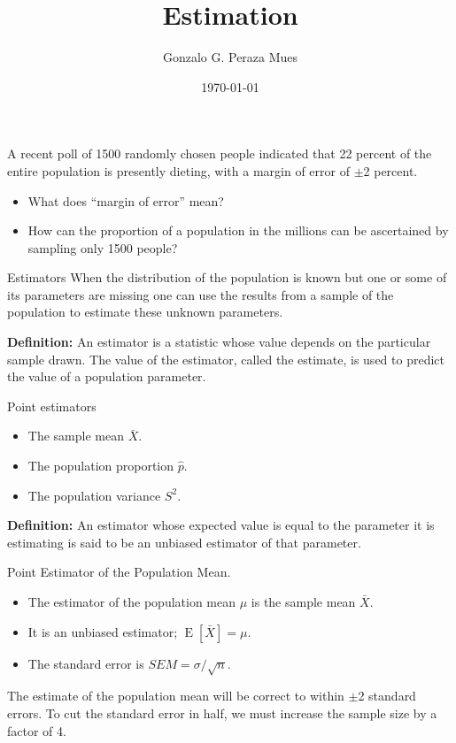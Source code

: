 \documentclass{beamer}
\title{Estimation}
\date{\today}
\author{Gonzalo G. Peraza Mues}
\newcommand{\E}[1]{\operatorname{E}\left[#1\right]}
\begin{document}
\maketitle
\begin{frame}
  A recent poll of 1500 randomly chosen people indicated that 22 percent of the
  entire population is presently dieting, with a margin of error of $\pm$2 percent.

  \begin{itemize}
  \item What does ``margin of error'' mean?
  \item How can the proportion of a population in the millions can be
    ascertained by sampling only 1500 people?
  \end{itemize}
\end{frame}

\begin{frame}{Estimators}
  When the distribution of the population is known but one or some of its
  parameters are missing one can use the results from a sample of the population
  to estimate these unknown parameters.

  \textbf{Definition: }An \alert{estimator} is a statistic whose value depends on
  the particular sample drawn. The value of the estimator, called the
  \alert{estimate}, is used to predict the value of a population parameter.
\end{frame}

\begin{frame}{Point estimators}

  \begin{itemize}
  \item The sample mean $\bar{X}$.
  \item The population proportion $\hat{p}$.
  \item The population variance $S^2$.
  \end{itemize}

  \textbf{Definition: }An estimator whose expected value is equal to the
  parameter it is estimating is said to be an \alert{unbiased} estimator of that
  parameter.

\end{frame}

\begin{frame}{Point Estimator of the Population Mean.}
  \begin{itemize}
  \item The estimator of the population mean $\mu$ is the sample mean $\bar{X}$.
  \item It is an unbiased estimator; $\E{\bar{X}}=\mu$.
  \item The standard error is $SEM=\sigma/\sqrt{n}$.
  \end{itemize}

  The estimate of the population mean will be correct to within $\pm$2 standard
  errors. To cut the standard error in half, we must increase the sample size by
  a factor of 4.
\end{frame}
\end{document}
